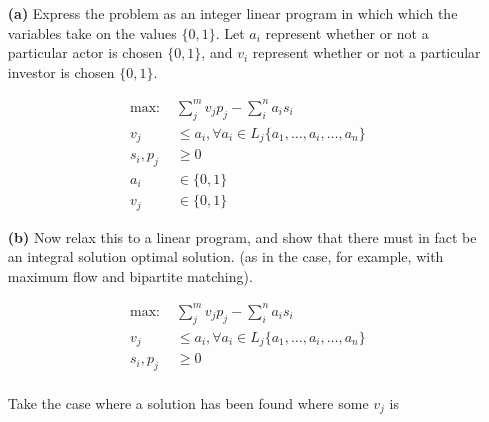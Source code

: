 \documentclass[11pt]{article}
\begin{document}
\begin{itemize}
  \item[{\bf (a)}] Express the problem as an integer linear program in which 
    which the variables take on the values $\{0,1\}$. Let $a_i$ represent
    whether or not a particular actor is chosen $\{0,1\}$, and $v_i$ represent
    whether or not a particular investor is chosen $\{0,1\}$.
    
    \begin{equation*}
      \begin{aligned}
        \mbox{max: } &\sum_{j}^{m}v_jp_j - \sum_{i}^{n}a_is_i\\
        v_j &\leq a_i, \forall a_i\in L_j\{a_1,\ldots,a_i,\ldots,a_n\}\\
        s_i,p_j &\geq 0\\
        a_i&\in\{0,1\}\\
        v_j&\in\{0,1\}
      \end{aligned}
    \end{equation*}

  \item[{\bf (b)}] Now relax this to a linear program, and show that there must
    in fact be an integral solution optimal solution. (as in the case, for 
    example, with maximum flow and bipartite matching).

    \begin{equation*}
      \begin{aligned}
        \mbox{max: } &\sum_{j}^{m}v_jp_j - \sum_{i}^{n}a_is_i\\
        v_j &\leq a_i, \forall a_i\in L_j\{a_1,\ldots,a_i,\ldots,a_n\}\\
        s_i,p_j &\geq 0\\
      \end{aligned}
    \end{equation*}

    Take the case where a solution has been found where some  $v_j$ is

\end{itemize}
\label{pg:end-of-p2}
%
\end{document}

